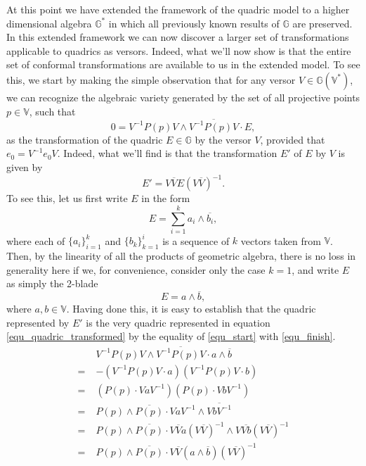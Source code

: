 \documentclass{birkjour}
\theoremstyle{definition}
\theoremstyle{remark}
\numberwithin{equation}{section}
\newcommand{\G}{\mathbb{G}}
\newcommand{\V}{\mathbb{V}}
\begin{document}
At this point we have extended the framework of the quadric model to a higher dimensional
algebra $\G^*$ in which all previously known results of $\G$ are preserved.  In this extended framework
we can now discover a larger set of transformations applicable to quadrics as versors.  Indeed, what
we'll now show is that the entire set of conformal transformations are available to us in the extended model.
To see this, we start by making the simple observation that for any versor $V\in\G(\V^*)$, we can
recognize the algebraic variety generated by the set of all projective points $p\in\V$, such that
\begin{equation}\label{equ_quadric_transformed}
0 = V^{-1}P(p)V\wedge\overline{V^{-1}P(p)V}\cdot E,
\end{equation}
as the transformation of the quadric $E\in\G$ by the versor $V$, provided
that $e_0=V^{-1}e_0V$.  Indeed, what we'll find
is that the transformation $E'$ of $E$ by $V$ is given by
\begin{equation}
E' = V\overline{V}E(V\overline{V})^{-1}.
\end{equation}
To see this, let us first write $E$ in the form
\begin{equation}
E = \sum_{i=1}^k a_i\wedge\overline{b_i},
\end{equation}
where each of $\{a_i\}_{i=1}^k$ and $\{b_k\}_{k=1}^i$ is a sequence of $k$ vectors taken from $\V$.
Then, by the linearity of all the products of geometric algebra, there is no loss in generality here
if we, for convenience, consider only the case $k=1$, and write $E$ as simply the 2-blade
\begin{equation}
E = a\wedge\overline{b},
\end{equation}
where $a,b\in\V$.  Having done this, it is easy to establish that the quadric represented by $E'$
is the very quadric represented in equation \eqref{equ_quadric_transformed} by the equality of
\eqref{equ_start} with \eqref{equ_finish}.
\begin{align}
 & V^{-1}P(p)V\wedge\overline{V^{-1}P(p)V}\cdot a\wedge\overline{b}\label{equ_start} \\
=\;& -(V^{-1}P(p)V\cdot a)(V^{-1}P(p)V\cdot b) \\
=\;& (P(p)\cdot VaV^{-1})(P(p)\cdot VbV^{-1}) \\
=\;& P(p)\wedge\overline{P(p)}\cdot VaV^{-1}\wedge\overline{VbV^{-1}}\label{equ_before_versor_invariance} \\
=\;& P(p)\wedge\overline{P(p)}\cdot
V\overline{V}a(V\overline{V})^{-1}\wedge V\overline{Vb}(V\overline{V})^{-1}\label{equ_after_versor_invariance} \\
=\;& P(p)\wedge\overline{P(p)}\cdot V\overline{V}(a\wedge\overline{b})(V\overline{V})^{-1}\label{equ_finish}
\end{align}
\end{document}
